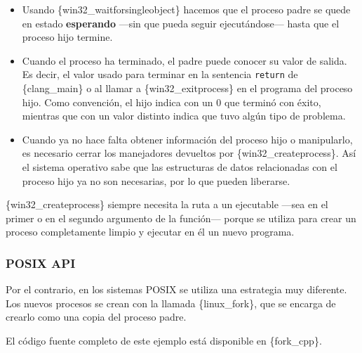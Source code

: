 \begin{itemize}
  \{win32\_getlasterror\} obtiene el código que identifica el motivo del
  error de la última función utilizada de Windows API.
\item
  Usando \{win32\_waitforsingleobject\} hacemos que el proceso padre se
  quede en estado \textbf{esperando} ---sin que pueda seguir
  ejecutándose--- hasta que el proceso hijo termine.
\item
  Cuando el proceso ha terminado, el padre puede conocer su valor de
  salida. Es decir, el valor usado para terminar en la sentencia
  \texttt{return} de \{clang\_main\} o al llamar a
  \{win32\_exitprocess\} en el programa del proceso hijo. Como
  convención, el hijo indica con un 0 que terminó con éxito, mientras
  que con un valor distinto indica que tuvo algún tipo de problema.
\item
  Cuando ya no hace falta obtener información del proceso hijo o
  manipularlo, es necesario cerrar los manejadores devueltos por
  \{win32\_createprocess\}. Así el sistema operativo sabe que las
  estructuras de datos relacionadas con el proceso hijo ya no son
  necesarias, por lo que pueden liberarse.
\end{itemize}

\{win32\_createprocess\} siempre necesita la ruta a un ejecutable ---sea
en el primer o en el segundo argumento de la función--- porque se
utiliza para crear un proceso completamente limpio y ejecutar en él un
nuevo programa.

\subsubsection{POSIX API}\label{sect-procesos-posix-api}

Por el contrario, en los sistemas POSIX se utiliza una estrategia muy
diferente. Los nuevos procesos se crean con la llamada \{linux\_fork\},
que se encarga de crearlo como una copia del proceso padre.

El código fuente completo de este ejemplo está disponible en
\{fork\_cpp\}.

